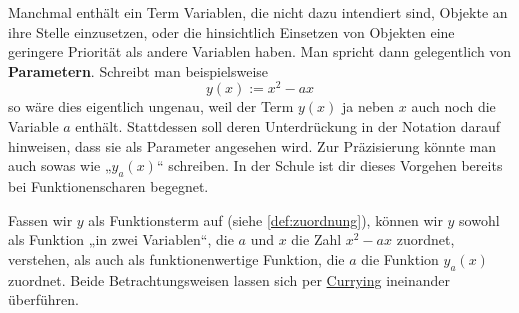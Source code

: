 \begin{bem}[* Parameter] 
    Manchmal enthält ein Term Variablen, die nicht dazu intendiert sind, Objekte an ihre Stelle einzusetzen, oder die hinsichtlich Einsetzen von Objekten eine geringere Priorität als andere Variablen haben. Man spricht dann gelegentlich von \textbf{Parametern}. Schreibt man beispielsweise
        \[ y(x):=x^2-ax \]
    so wäre dies eigentlich ungenau, weil der Term $y(x)$ ja neben $x$ auch noch die Variable $a$ enthält. Stattdessen soll deren Unterdrückung in der Notation darauf hinweisen, dass sie als Parameter angesehen wird. Zur Präzisierung könnte man auch sowas wie „$y_a(x)$“ schreiben. In der Schule ist dir dieses Vorgehen bereits bei Funktionenscharen begegnet.
\end{bem}


\begin{vorschau}
    Fassen wir $y$ als Funktionsterm auf (siehe \cref{def:zuordnung}), können wir $y$ sowohl als Funktion „in zwei Variablen“, die $a$ und $x$ die Zahl $x^2-ax$ zuordnet, verstehen, als auch als funktionenwertige Funktion, die $a$ die Funktion $y_a(x)$ zuordnet. Beide Betrachtungsweisen lassen sich per \href{https://ncatlab.org/nlab/show/currying}{Currying} ineinander überführen.
\end{vorschau}


